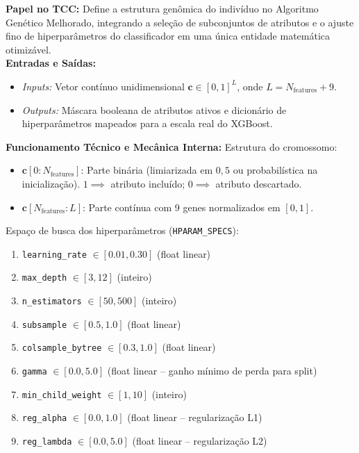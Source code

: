 \documentclass[10pt,a4paper]{article}
\begin{document}
\begin{filebox}
\textbf{Papel no TCC:} Define a estrutura genômica do indivíduo no Algoritmo Genético Melhorado, integrando a seleção de subconjuntos de atributos e o ajuste fino de hiperparâmetros do classificador em uma única entidade matemática otimizável.\\
\textbf{Entradas e Saídas:}
\begin{itemize}[leftmargin=*,itemsep=1pt]
  \item \textit{Inputs:} Vetor contínuo unidimensional $\mathbf{c} \in [0, 1]^L$, onde $L = N_{\text{features}} + 9$.
  \item \textit{Outputs:} Máscara booleana de atributos ativos e dicionário de hiperparâmetros mapeados para a escala real do XGBoost.
\end{itemize}
\textbf{Funcionamento Técnico e Mecânica Interna:} 
Estrutura do cromossomo:
\begin{itemize}[leftmargin=*,itemsep=1pt]
  \item $\mathbf{c}[0 : N_{\text{features}}]$: Parte binária (limiarizada em $0,5$ ou probabilística na inicialização). $1 \implies$ atributo incluído; $0 \implies$ atributo descartado.
  \item $\mathbf{c}[N_{\text{features}} : L]$: Parte contínua com 9 genes normalizados em $[0, 1]$.
\end{itemize}
Espaço de busca dos hiperparâmetros (\texttt{HPARAM\_SPECS}):
\begin{enumerate}[leftmargin=*,itemsep=0pt]
  \item \texttt{learning\_rate} $\in [0.01, 0.30]$ (float linear)
  \item \texttt{max\_depth} $\in [3, 12]$ (inteiro)
  \item \texttt{n\_estimators} $\in [50, 500]$ (inteiro)
  \item \texttt{subsample} $\in [0.5, 1.0]$ (float linear)
  \item \texttt{colsample\_bytree} $\in [0.3, 1.0]$ (float linear)
  \item \texttt{gamma} $\in [0.0, 5.0]$ (float linear -- ganho mínimo de perda para split)
  \item \texttt{min\_child\_weight} $\in [1, 10]$ (inteiro)
  \item \texttt{reg\_alpha} $\in [0.0, 1.0]$ (float linear -- regularização L1)
  \item \texttt{reg\_lambda} $\in [0.0, 5.0]$ (float linear -- regularização L2)

\end{enumerate}
\end{filebox}
\end{document}
